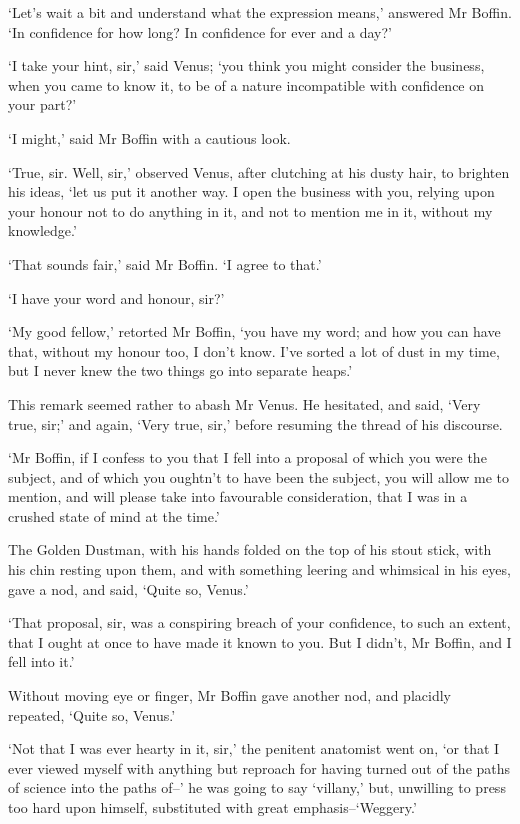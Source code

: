 ‘Let’s wait a bit and understand what the expression means,’ answered Mr
Boffin. ‘In confidence for how long? In confidence for ever and a day?’

‘I take your hint, sir,’ said Venus; ‘you think you might consider the
business, when you came to know it, to be of a nature incompatible with
confidence on your part?’

‘I might,’ said Mr Boffin with a cautious look.

‘True, sir. Well, sir,’ observed Venus, after clutching at his dusty
hair, to brighten his ideas, ‘let us put it another way. I open the
business with you, relying upon your honour not to do anything in it,
and not to mention me in it, without my knowledge.’

‘That sounds fair,’ said Mr Boffin. ‘I agree to that.’

‘I have your word and honour, sir?’

‘My good fellow,’ retorted Mr Boffin, ‘you have my word; and how you
can have that, without my honour too, I don’t know. I’ve sorted a lot
of dust in my time, but I never knew the two things go into separate
heaps.’

This remark seemed rather to abash Mr Venus. He hesitated, and said,
‘Very true, sir;’ and again, ‘Very true, sir,’ before resuming the
thread of his discourse.

‘Mr Boffin, if I confess to you that I fell into a proposal of which you
were the subject, and of which you oughtn’t to have been the subject,
you will allow me to mention, and will please take into favourable
consideration, that I was in a crushed state of mind at the time.’

The Golden Dustman, with his hands folded on the top of his stout
stick, with his chin resting upon them, and with something leering and
whimsical in his eyes, gave a nod, and said, ‘Quite so, Venus.’

‘That proposal, sir, was a conspiring breach of your confidence, to
such an extent, that I ought at once to have made it known to you. But I
didn’t, Mr Boffin, and I fell into it.’

Without moving eye or finger, Mr Boffin gave another nod, and placidly
repeated, ‘Quite so, Venus.’

‘Not that I was ever hearty in it, sir,’ the penitent anatomist went
on, ‘or that I ever viewed myself with anything but reproach for having
turned out of the paths of science into the paths of--’ he was going
to say ‘villany,’ but, unwilling to press too hard upon himself,
substituted with great emphasis--‘Weggery.’


